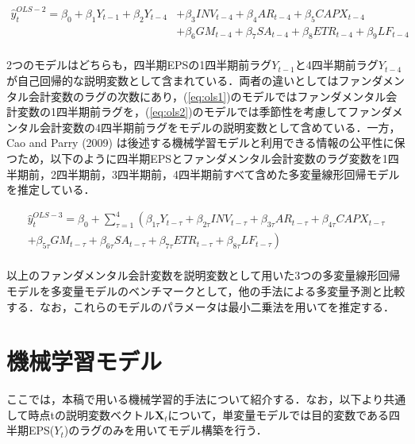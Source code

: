 \documentclass[a4paper，12pt]{jsarticle}
\begin{document}
\begin{equation}
  \begin{split}
    \label{eq:ols2}
    \hat{y}_t^{OLS-2} = \beta_0 + \beta_1Y_{t-1} + \beta_2Y_{t-4} 
    &+ \beta_3INV_{t-4} + \beta_4AR_{t-4} + \beta_5CAPX_{t-4} \\
    &+ \beta_6GM_{t-4} + \beta_7SA_{t-4} + \beta_8ETR_{t-4} + \beta_9LF_{t-4} \\
  \end{split}
\end{equation}

2つのモデルはどちらも，四半期EPSの1四半期前ラグ$Y_{t-1}$と4四半期前ラグ$Y_{t-4}$が自己回帰的な説明変数として含まれている．両者の違いとしてはファンダメンタル会計変数のラグの次数にあり，(\ref{eq:ols1})のモデルではファンダメンタル会計変数の1四半期前ラグを，(\ref{eq:ols2})のモデルでは季節性を考慮してファンダメンタル会計変数の4四半期前ラグをモデルの説明変数として含めている．一方，Cao and Parry (2009) は後述する機械学習モデルと利用できる情報の公平性に保つため，以下のように四半期EPSとファンダメンタル会計変数のラグ変数を1四半期前，2四半期前，3四半期前，4四半期前すべて含めた多変量線形回帰モデルを推定している．

\begin{equation}
  \begin{split}
    \label{eq:ols3}
    \hat{y}_t^{OLS-3} = \beta_0 + \sum^{4}_{\tau=1} \left( \beta_{1\tau}Y_{t-\tau} 
    + \beta_{2\tau}INV_{t-\tau} + \beta_{3\tau}AR_{t-\tau} + \beta_{4\tau}CAPX_{t-\tau} \right.\\
    \left.+ \beta_{5\tau}GM_{t-\tau} + \beta_{6\tau}SA_{t-\tau} + \beta_{7\tau}ETR_{t-\tau} + \beta_{8\tau}LF_{t-\tau} \right) \\
  \end{split}
\end{equation}

以上のファンダメンタル会計変数を説明変数として用いた3つの多変量線形回帰モデルを多変量モデルのベンチマークとして，他の手法による多変量予測と比較する．なお，これらのモデルのパラメータは最小二乗法を用いてを推定する．

\section{機械学習モデル}


ここでは，本稿で用いる機械学習的手法について紹介する．なお，以下より共通して時点tの説明変数ベクトル$\bm{X}_t$について，単変量モデルでは目的変数である四半期EPS($Y_t$)のラグのみを用いてモデル構築を行う．
\end{document}
